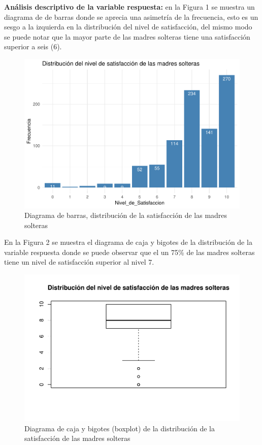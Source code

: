 \documentclass[11pt,twoside]{article}
\begin{document}
\textbf{Análisis descriptivo de la variable respuesta:} en la Figura 1 se muestra un diagrama de de barras donde se aprecia una asimetría de la frecuencia, esto es un sesgo a la izquierda en la distribución del nivel de satisfacción, del mismo modo se puede notar que la mayor parte de las madres solteras tiene una satisfacción superior a seis (6). 
\\
\begin{figure}[H]
	\centering
	\includegraphics{barras2.pdf}
	\caption{Diagrama de barras, distribución de la satisfacción de las madres solteras}
\end{figure}



\vspace{100px}
\noindent
En la Figura 2 se muestra el diagrama de caja y bigotes de la distribución de la variable respuesta donde se puede observar que el un 75{\%} de las madres solteras tiene un nivel de satisfacción superior al nivel 7. 
\begin{figure}[H]
	\centering
	\includegraphics{boxplot1.pdf}
	\caption{Diagrama de caja y bigotes (boxplot) de la distribución de la satisfacción de las madres solteras}
\end{figure}
\end{document}
